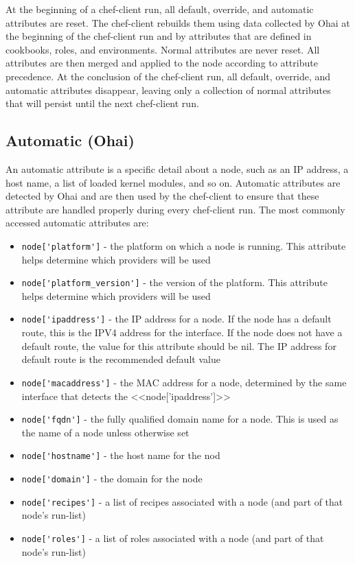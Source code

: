 At the beginning of a chef-client run, all default, override, and automatic attributes are reset. The chef-client rebuilds them using data collected by Ohai at the beginning of the chef-client run and by attributes that are defined in cookbooks, roles, and environments. Normal attributes are never reset. All attributes are then merged and applied to the node according to attribute precedence. At the conclusion of the chef-client run, all default, override, and automatic attributes disappear, leaving only a collection of normal attributes that will persist until the next chef-client run.

\subsection{Automatic (Ohai)}

An automatic attribute is a specific detail about a node, such as an IP address, a host name, a list of loaded kernel modules, and so on. Automatic attributes are detected by Ohai and are then used by the chef-client to ensure that these attribute are handled properly during every chef-client run. The most commonly accessed automatic attributes are:

\begin{itemize}
  \item \lstinline!node['platform']! - the platform on which a node is running. This attribute helps determine which providers will be used
  \item \lstinline!node['platform_version']! - the version of the platform. This attribute helps determine which providers will be used
  \item \lstinline!node['ipaddress']! - the IP address for a node. If the node has a default route, this is the IPV4 address for the interface. If the node does not have a default route, the value for this attribute should be nil. The IP address for default route is the recommended default value
  \item \lstinline!node['macaddress']! - the MAC address for a node, determined by the same interface that detects the <<node['ipaddress']>>
  \item \lstinline!node['fqdn']! - the fully qualified domain name for a node. This is used as the name of a node unless otherwise set
  \item \lstinline!node['hostname']! - the host name for the nod
  \item \lstinline!node['domain']! - the domain for the node
  \item \lstinline!node['recipes']! - a list of recipes associated with a node (and part of that node’s run-list)
  \item \lstinline!node['roles']! - a list of roles associated with a node (and part of that node’s run-list)
\end{itemize}

